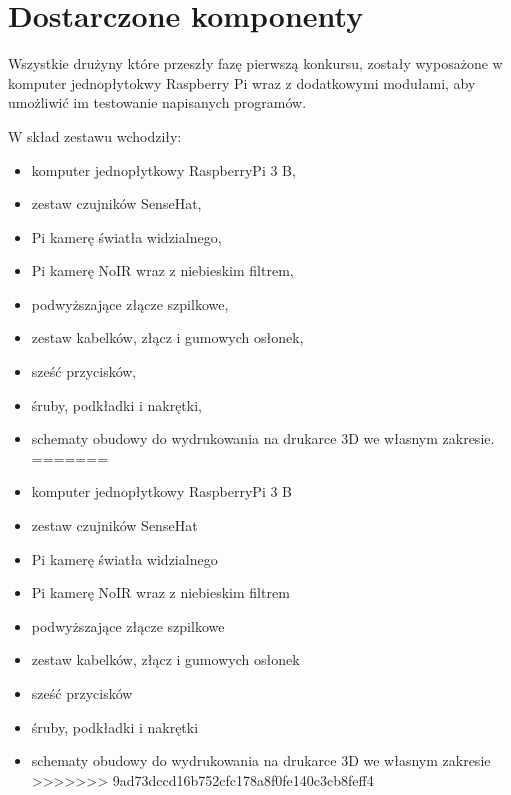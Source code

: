 \section{Dostarczone komponenty}\label{sec:cover_introduction}

Wszystkie drużyny które przeszły fazę pierwszą konkursu, zostały wyposażone
w komputer jednopłytokwy Raspberry Pi wraz z dodatkowymi modułami, aby umożliwić im
testowanie napisanych programów.

W skład zestawu wchodziły:
\begin{itemize}
<<<<<<< HEAD
    \item komputer jednopłytkowy RaspberryPi 3 B,
    \item zestaw czujników SenseHat,
    \item Pi kamerę światła widzialnego,
    \item Pi kamerę NoIR wraz z niebieskim filtrem,
    \item podwyższające złącze szpilkowe,
    \item zestaw kabelków, złącz i gumowych osłonek,
    \item sześć przycisków,
    \item śruby, podkładki i nakrętki,
    \item schematy obudowy do wydrukowania na drukarce 3D we własnym zakresie.
=======
    \item komputer jednopłytkowy RaspberryPi 3 B
    \item zestaw czujników SenseHat
    \item Pi kamerę światła widzialnego
    \item Pi kamerę NoIR wraz z niebieskim filtrem
    \item podwyższające złącze szpilkowe
    \item zestaw kabelków, złącz i gumowych osłonek
    \item sześć przycisków
    \item śruby, podkładki i nakrętki
    \item schematy obudowy do wydrukowania na drukarce 3D we własnym zakresie
>>>>>>> 9ad73dccd16b752cfc178a8f0fe140c3cb8feff4
\end{itemize}

